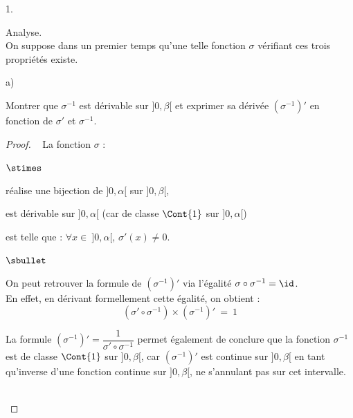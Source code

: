 \begin{noliste}{1.}
  \setlength{\itemsep}{4mm}
  \setcounter{enumi}{5}
  \item Analyse.\\
  On suppose dans un premier temps qu'une telle fonction $\sigma$ 
  vérifiant ces trois propriétés existe.
  \begin{noliste}{a)}
    \setlength{\itemsep}{2mm}
    \item Montrer que $\sigma^{-1}$ est dérivable sur $]0,\beta[$ et 
    exprimer sa dérivée $(\sigma^{-1})'$ en fonction de $\sigma'$
    et $\sigma^{-1}$.
    
    \begin{proof}~
      La fonction $\sigma$ :
      \begin{noliste}{$\stimes$}
	\item réalise une bijection de $]0,\alpha[$ sur $]0,\beta[$,
	\item est dérivable sur $]0,\alpha[$ (car de classe $\Cont{1}$ 
	sur $]0,\alpha[$)
	\item est telle que : $\forall x \in \ ]0,\alpha[$, 
	$\sigma'(x) \neq 0$.
      \end{noliste}
      \conc{Alors $\sigma^{-1}$ est dérivable sur $]0,\beta[$ et 
      $(\sigma^{-1})' = \dfrac{1}{\sigma' \circ \sigma^{-1}}$.}
      
      \begin{remark}
        \begin{noliste}{$\sbullet$}
	  \item On peut retrouver la formule de $(\sigma^{-1})'$
	  via l'égalité $\sigma \circ \sigma^{-1} = \id$.\\
	  En effet, en dérivant formellement cette égalité, on 
	  obtient :
	  \[
	    (\sigma' \circ \sigma^{-1}) \times (\sigma^{-1})' \ = \
	    1
	  \]
	  
	  \item La formule $(\sigma^{-1})' = \dfrac{1}{\sigma' \circ 
	  \sigma^{-1}}$ permet également de conclure que la 
	  fonction $\sigma^{-1}$ est de classe $\Cont{1}$ sur 
	  $]0,\beta[$, car $(\sigma^{-1})'$ est continue sur 
	  $]0,\beta[$ en tant qu'inverse d'une fonction continue
	  sur $]0,\beta[$, ne s'annulant pas sur cet 
	  intervalle.
        \end{noliste}
      \end{remark}~\\[-1.4cm]
    \end{proof}
    
    
    \newpage


\end{noliste}
\end{noliste}
